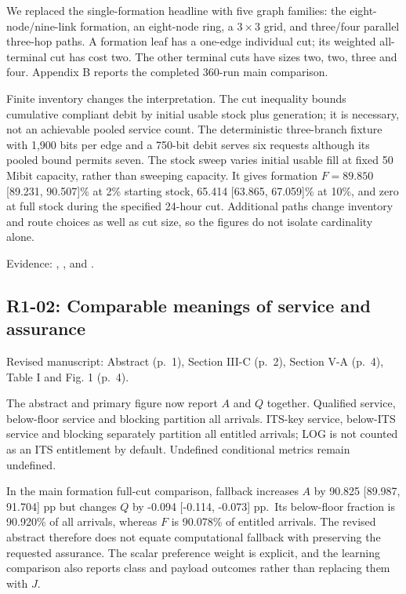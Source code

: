 We replaced the single-formation headline with five graph families: the eight-node/nine-link formation, an eight-node ring, a \(3\times3\) grid, and three/four parallel three-hop paths. A formation leaf has a one-edge individual cut; its weighted all-terminal cut has cost two. The other terminal cuts have sizes two, two, three and four. Appendix B reports the completed 360-run main comparison.

Finite inventory changes the interpretation. The cut inequality bounds cumulative compliant debit by initial usable stock plus generation; it is necessary, not an achievable pooled service count. The deterministic three-branch fixture with 1,900 bits per edge and a 750-bit debit serves six requests although its pooled bound permits seven. The stock sweep varies initial usable fill at fixed 50 Mibit capacity, rather than sweeping capacity. It gives formation \(F=89.850\) {[}89.231, 90.507{]}\% at 2\% starting stock, 65.414 {[}63.865, 67.059{]}\% at 10\%, and zero at full stock during the specified 24-hour cut. Additional paths change inventory and route choices as well as cut size, so the figures do not isolate cardinality alone.

Evidence: , , and .

\subsection{R1-02: Comparable meanings of service and assurance}\label{r1-02-comparable-meanings-of-service-and-assurance}

Revised manuscript: Abstract (p.~1), Section III-C (p.~2), Section V-A (p.~4), Table I and Fig. 1 (p.~4).

The abstract and primary figure now report \(A\) and \(Q\) together. Qualified service, below-floor service and blocking partition all arrivals. ITS-key service, below-ITS service and blocking separately partition all entitled arrivals; LOG is not counted as an ITS entitlement by default. Undefined conditional metrics remain undefined.

In the main formation full-cut comparison, fallback increases \(A\) by 90.825 {[}89.987, 91.704{]} pp but changes \(Q\) by -0.094 {[}-0.114, -0.073{]} pp.~Its below-floor fraction is 90.920\% of all arrivals, whereas \(F\) is 90.078\% of entitled arrivals. The revised abstract therefore does not equate computational fallback with preserving the requested assurance. The scalar preference weight is explicit, and the learning comparison also reports class and payload outcomes rather than replacing them with \(J\).

